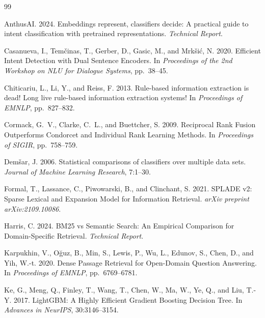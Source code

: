 \documentclass[11pt]{article}
\begin{document}
\begingroup
\small
\begin{thebibliography}{99}

AnthusAI. 2024.
\newblock Embeddings represent, classifiers decide: A practical guide to intent classification with pretrained representations.
\newblock \emph{Technical Report}.

Casanueva, I., Tem\v{c}inas, T., Gerber, D., Gasic, M., and Mrk\v{s}i\'{c}, N. 2020.
\newblock Efficient Intent Detection with Dual Sentence Encoders.
\newblock In \emph{Proceedings of the 2nd Workshop on NLU for Dialogue Systems}, pp.~38--45.

Chiticariu, L., Li, Y., and Reiss, F. 2013.
\newblock Rule-based information extraction is dead! Long live rule-based information extraction systems!
\newblock In \emph{Proceedings of EMNLP}, pp.~827--832.

Cormack, G.~V., Clarke, C.~L., and Buettcher, S. 2009.
\newblock Reciprocal Rank Fusion Outperforms Condorcet and Individual Rank Learning Methods.
\newblock In \emph{Proceedings of SIGIR}, pp.~758--759.

Dem\v{s}ar, J. 2006.
\newblock Statistical comparisons of classifiers over multiple data sets.
\newblock \emph{Journal of Machine Learning Research}, 7:1--30.

Formal, T., Lassance, C., Piwowarski, B., and Clinchant, S. 2021.
\newblock SPLADE v2: Sparse Lexical and Expansion Model for Information Retrieval.
\newblock \emph{arXiv preprint arXiv:2109.10086}.

Harris, C. 2024.
\newblock BM25 vs Semantic Search: An Empirical Comparison for Domain-Specific Retrieval.
\newblock \emph{Technical Report}.

Karpukhin, V., O\u{g}uz, B., Min, S., Lewis, P., Wu, L., Edunov, S., Chen, D., and Yih, W.-t. 2020.
\newblock Dense Passage Retrieval for Open-Domain Question Answering.
\newblock In \emph{Proceedings of EMNLP}, pp.~6769--6781.

Ke, G., Meng, Q., Finley, T., Wang, T., Chen, W., Ma, W., Ye, Q., and Liu, T.-Y. 2017.
\newblock LightGBM: A Highly Efficient Gradient Boosting Decision Tree.
\newblock In \emph{Advances in NeurIPS}, 30:3146--3154.


\end{thebibliography}
\end{document}
